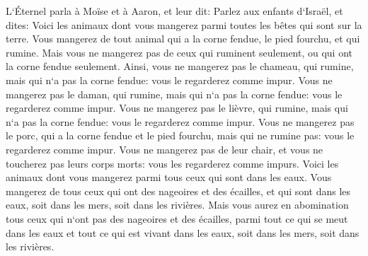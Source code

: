 \verse L`Éternel parla à Moïse et à Aaron, et leur dit: 
\verse Parlez aux enfants d`Israël, et dites: Voici les animaux dont vous mangerez parmi toutes les bêtes qui sont sur la terre. 
\verse Vous mangerez de tout animal qui a la corne fendue, le pied fourchu, et qui rumine. 
\verse Mais vous ne mangerez pas de ceux qui ruminent seulement, ou qui ont la corne fendue seulement. Ainsi, vous ne mangerez pas le chameau, qui rumine, mais qui n`a pas la corne fendue: vous le regarderez comme impur. 
\verse Vous ne mangerez pas le daman, qui rumine, mais qui n`a pas la corne fendue: vous le regarderez comme impur. 
\verse Vous ne mangerez pas le lièvre, qui rumine, mais qui n`a pas la corne fendue: vous le regarderez comme impur. 
\verse Vous ne mangerez pas le porc, qui a la corne fendue et le pied fourchu, mais qui ne rumine pas: vous le regarderez comme impur. 
\verse Vous ne mangerez pas de leur chair, et vous ne toucherez pas leurs corps morts: vous les regarderez comme impurs. 
\verse Voici les animaux dont vous mangerez parmi tous ceux qui sont dans les eaux. Vous mangerez de tous ceux qui ont des nageoires et des écailles, et qui sont dans les eaux, soit dans les mers, soit dans les rivières. 
\verse Mais vous aurez en abomination tous ceux qui n`ont pas des nageoires et des écailles, parmi tout ce qui se meut dans les eaux et tout ce qui est vivant dans les eaux, soit dans les mers, soit dans les rivières. 
